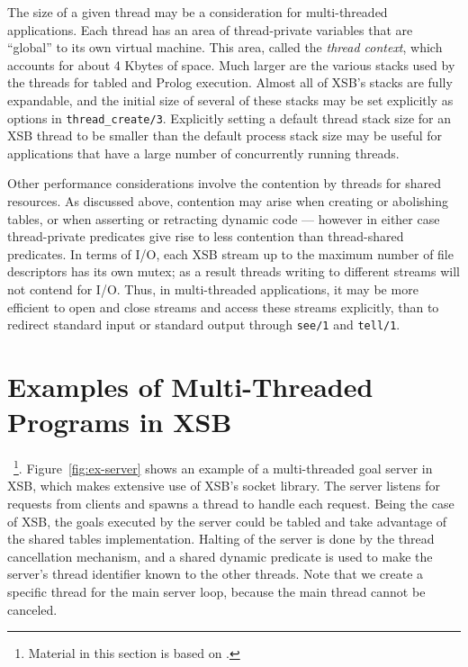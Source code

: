 The size of a given thread may be a consideration for multi-threaded
applications.  Each thread has an area of thread-private variables
that are ``global'' to its own virtual machine.  This area, called the
{\em thread context}, which accounts for about 4 Kbytes of space.
Much larger are the various stacks used by the threads for tabled and
Prolog execution.  Almost all of XSB's stacks are fully expandable,
and the initial size of several of these stacks may be set explicitly
as options in {\tt thread\_create/3}.  Explicitly setting a default
thread stack size for an XSB thread to be smaller than the default
process stack size may be useful for applications that have a large
number of concurrently running threads.

Other performance considerations involve the contention by threads for
shared resources.  As discussed above, contention may arise when
creating or abolishing tables, or when asserting or retracting dynamic
code --- however in either case thread-private predicates give rise to
less contention than thread-shared predicates.  In terms of I/O, each
XSB stream up to the maximum number of file descriptors has its own
mutex; as a result threads writing to different streams will not
contend for I/O.  Thus, in multi-threaded applications, it may be more
efficient to open and close streams and access these streams
explicitly, than to redirect standard input or standard output through
{\tt see/1} and {\tt tell/1}.

\section{Examples of Multi-Threaded Programs in
  XSB}~\footnote{Material in this section is based on
  \cite{Marques07}.}. 
Figure~\ref{fig:ex-server} shows an example of a multi-threaded goal
server in XSB, which makes extensive use of XSB's socket library. The
server listens for requests from clients and spawns a thread to handle
each request. Being the case of XSB, the goals executed by the server
could be tabled and take advantage of the shared tables
implementation. Halting of the server is done by the thread
cancellation mechanism, and a shared dynamic predicate is used to make
the server's thread identifier known to the other threads. Note that
we create a specific thread for the main server loop, because the main
thread cannot be canceled.


